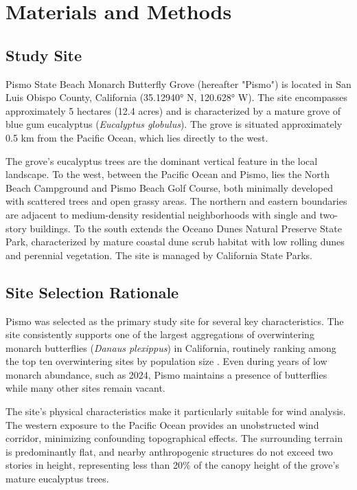 \section{Materials and Methods}
\subsection{Study Site}
Pismo State Beach Monarch Butterfly Grove (hereafter "Pismo") is located in San Luis Obispo County, California (35.12940° N, 120.628° W). The site encompasses approximately 5 hectares (12.4 acres) and is characterized by a mature grove of blue gum eucalyptus (\textit{Eucalyptus globulus}). The grove is situated approximately 0.5 km from the Pacific Ocean, which lies directly to the west.

The grove's eucalyptus trees are the dominant vertical feature in the local landscape. To the west, between the Pacific Ocean and Pismo, lies the North Beach Campground and Pismo Beach Golf Course, both minimally developed with scattered trees and open grassy areas. The northern and eastern boundaries are adjacent to medium-density residential neighborhoods with single and two-story buildings. To the south extends the Oceano Dunes Natural Preserve State Park, characterized by mature coastal dune scrub habitat with low rolling dunes and perennial vegetation. The site is managed by California State Parks.


\subsection{Site Selection Rationale}
Pismo was selected as the primary study site for several key characteristics. The site consistently supports one of the largest aggregations of overwintering monarch butterflies (\textit{Danaus plexippus}) in California, routinely ranking among the top ten overwintering sites by population size \autocite{westernmonarchcount2023}. Even during years of low monarch abundance, such as 2024, Pismo maintains a presence of butterflies while many other sites remain vacant.

The site's physical characteristics make it particularly suitable for wind analysis. The western exposure to the Pacific Ocean provides an unobstructed wind corridor, minimizing confounding topographical effects. The surrounding terrain is predominantly flat, and nearby anthropogenic structures do not exceed two stories in height, representing less than 20\% of the canopy height of the grove's mature eucalyptus trees.

